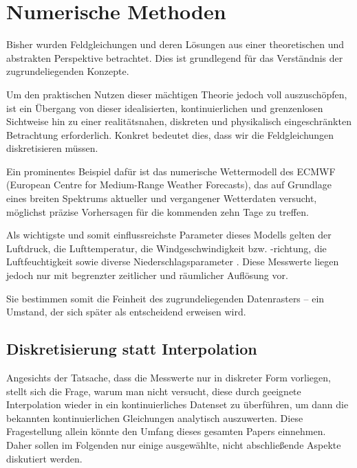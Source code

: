 %
%
%
%
\section{Numerische Methoden}

Bisher wurden Feldgleichungen und deren Lösungen aus einer theoretischen und abstrakten Perspektive betrachtet.
Dies ist grundlegend für das Verständnis der zugrundeliegenden Konzepte.

Um den praktischen Nutzen dieser mächtigen Theorie jedoch voll auszuschöpfen, ist ein Übergang von dieser idealisierten, kontinuierlichen und grenzenlosen Sichtweise hin zu einer realitätsnahen, diskreten und physikalisch eingeschränkten Betrachtung erforderlich.
Konkret bedeutet dies, dass wir die Feldgleichungen diskretisieren müssen.

Ein prominentes Beispiel dafür ist das numerische Wettermodell des ECMWF (European Centre for Medium-Range Weather Forecasts), das auf Grundlage eines breiten Spektrums aktueller und vergangener Wetterdaten versucht, möglichst präzise Vorhersagen für die kommenden zehn Tage zu treffen.

Als wichtigste und somit einflussreichste Parameter dieses Modells gelten der Luftdruck, die Lufttemperatur, die Windgeschwindigkeit bzw. -richtung, die Luftfeuchtigkeit sowie diverse Niederschlagsparameter \cite{ecmwf2023}.
Diese Messwerte liegen jedoch nur mit begrenzter zeitlicher und räumlicher Auflösung vor.

Sie bestimmen somit die Feinheit des zugrundeliegenden Datenrasters – ein Umstand, der sich später als entscheidend erweisen wird.

\subsection{Diskretisierung statt Interpolation}

Angesichts der Tatsache, dass die Messwerte nur in diskreter Form vorliegen, stellt sich die Frage, warum man nicht versucht, diese durch geeignete Interpolation wieder in ein kontinuierliches Datenset zu überführen, um dann die bekannten kontinuierlichen Gleichungen analytisch auszuwerten.
Diese Fragestellung allein könnte den Umfang dieses gesamten Papers einnehmen.
Daher sollen im Folgenden nur einige ausgewählte, nicht abschließende Aspekte diskutiert werden.

